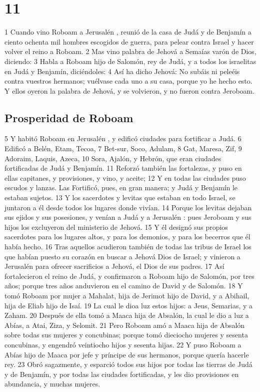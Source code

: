 \chapter{11}

1 Cuando vino Roboam a Jerusalén , reunió de la casa de Judá y de Benjamín a ciento  ochenta mil hombres escogidos de guerra, para pelear contra Israel y hacer volver el reino a Roboam.
2 Mas vino palabra de Jehová a Semaías varón de Dios, diciendo:
3 Habla a Roboam hijo de Salomón, rey de Judá, y a todos los israelitas en Judá y Benjamín, diciéndoles:
4 Así ha dicho Jehová: No subáis ni peleéis contra vuestros hermanos; vuélvase cada uno a su casa, porque yo he hecho esto. Y ellos oyeron la palabra de Jehová, y se volvieron, y no fueron contra Jeroboam.

\section*{Prosperidad de Roboam}

5 Y habitó Roboam en Jerusalén , y edificó ciudades para fortificar a Judá.
6 Edificó a Belén, Etam, Tecoa,
7 Bet-sur, Soco, Adulam,
8 Gat, Maresa, Zif,
9 Adoraim, Laquis, Azeca,
10 Sora, Ajalón, y  Hebrón, que eran ciudades fortificadas de Judá y Benjamín.
11 Reforzó también las fortalezas, y puso en ellas capitanes, y provisiones, y vino, y aceite;
12 Y en todas las ciudades puso escudos y lanzas. Las Fortificó, pues, en gran manera; y Judá y Benjamín le estaban sujetos.
13 Y los sacerdotes y levitas que estaban en todo Israel, se juntaron a él desde todos los lugares donde vivían.
14 Porque los levitas dejaban sus ejidos y sus posesiones, y venían a Judá y a Jerusalén : pues Jeroboam y sus hijos los excluyeron del ministerio de Jehová.
15 Y él designó sus propios sacerdotes para los lugares altos, y para los demonios, y para los becerros que él había hecho. 
16 Tras aquellos acudieron también de todas las tribus de Israel los que habían puesto su corazón en buscar a Jehová Dios de Israel; y vinieron a Jerusalén  para ofrecer sacrificios a Jehová, el Dios de sus padres.
17 Así fortalecieron el reino de Judá, y confirmaron a Roboam hijo de Salomón, por tres años; porque tres años anduvieron en el camino de David y de Salomón.
18 Y tomó Roboam por mujer a Mahalat, hija de Jerimot hijo de David, y a Abihail, hija de Eliab hijo de Isaí.
19 La cual le dioa luz estos hijos: a Jeus, Semarias, y a Zaham.
20 Después de ella tomó a Maaca hija de Absalón, la cual le dio a luz a Abías, a Atai, Ziza, y Selomit.
21 Pero Roboam amó a Maaca hija de Absalón sobre todas sus mujeres y concubinas; porque tomó dieciocho mujeres y sesenta concubinas, y engendró veintiocho hijos y sesenta hijas.
22 Y puso Roboam a Abías hijo de Maaca por jefe y príncipe de sus hermanos, porque quería hacerle rey.
23 Obró sagazmente, y esparció todos sus hijos por todas las tierras de Judá y de Benjamín, y por todas las ciudades fortificadas, y les dio provisiones en abundancia, y muchas mujeres.

